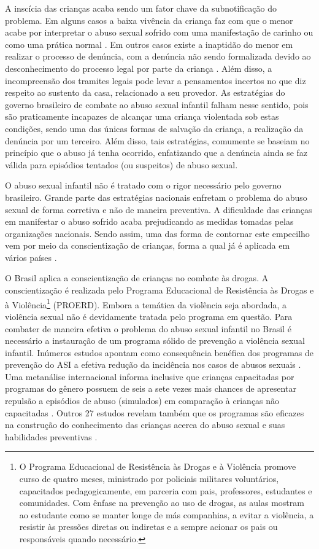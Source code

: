 A inscícia das crianças acaba sendo um fator chave da subnotificação do problema. Em alguns casos a baixa vivência da criança faz com que o menor acabe por interpretar o abuso sexual sofrido com uma manifestação de carinho ou como uma prática normal \cite{aded2006abuso}. Em outros casos existe a inaptidão do menor em realizar o processo de denúncia, com a denúncia não sendo formalizada devido ao desconhecimento do processo legal por parte da criança \cite{krug2002world}. Além disso, a incompreensão dos tramites legais pode levar a pensamentos incertos no que diz respeito ao sustento da casa, relacionado a seu provedor. As estratégias do governo brasileiro de combate ao abuso sexual infantil falham nesse sentido, pois são praticamente incapazes de alcançar uma criança violentada sob estas condições, sendo uma das únicas formas de salvação da criança, a realização da denúncia por um terceiro. Além disso, tais estratégias, comumente se baseiam no princípio que o abuso já tenha ocorrido, enfatizando que a denúncia ainda se faz válida para episódios tentados (ou suspeitos) de abuso sexual.

O abuso sexual infantil não é tratado com o rigor necessário pelo governo brasileiro. Grande parte das estratégias nacionais enfretam o problema do abuso sexual de forma corretiva e não de maneira preventiva. A dificuldade das crianças em manifestar o abuso sofrido acaba prejudicando as medidas tomadas pelas organizações nacionais. Sendo assim, uma das forma de contornar este empecilho vem por meio da conscientização de crianças, forma a qual já é aplicada em vários países \cite{plummer1999history, steiler2012orbit, muller2014child}.

O Brasil aplica a conscientização de crianças no combate às drogas. A conscientização é realizada pelo Programa Educacional de Resistência às Drogas e à Violência\footnote{O Programa Educacional de Resistência às Drogas e à Violência promove curso de quatro meses, ministrado por policiais militares voluntários, capacitados pedagogicamente, em parceria com pais, professores, estudantes e comunidades. Com ênfase na prevenção ao uso de drogas, as aulas mostram ao estudante como se manter longe de más companhias, a evitar a violência, a resistir às pressões diretas ou indiretas e a sempre acionar os pais ou responsáveis quando necessário.} (PROERD). Embora a temática da violência seja abordada, a violência sexual não é devidamente tratada pelo programa em questão. Para combater de maneira efetiva o problema do abuso sexual infantil no Brasil é necessário a instauração de um programa sólido de prevenção a violência sexual infantil. Inúmeros estudos apontam como consequência benéfica dos programas de prevenção do ASI a efetiva redução da incidência nos casos de abusos sexuais \cite{maria2010papel}. Uma metanálise internacional informa inclusive que crianças capacitadas por programas do gênero possuem de seis a sete vezes mais chances de apresentar repulsão a episódios de abuso (simulados) em comparação à crianças não capacitadas \cite{finkelhor2009prevention}. Outros 27 estudos revelam também que os programas são eficazes na construção do conhecimento das crianças acerca do abuso sexual e suas habilidades preventivas \cite{collin2013lessons}. 

